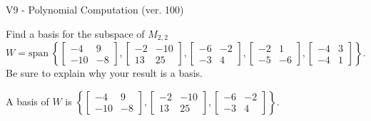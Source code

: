 \begin{exercise}
  \begin{exerciseTitle}V9 - Polynomial Computation (ver. 100)\end{exerciseTitle}
  \begin{exerciseStatement}
    Find a basis for the subspace of \(M_{2,2}\) 
\[W=\mathrm{span}\ \left\{\left[\begin{array}{cc}
-4 & 9 \\
-10 & -8
\end{array}\right] , \left[\begin{array}{cc}
-2 & -10 \\
13 & 25
\end{array}\right] , \left[\begin{array}{cc}
-6 & -2 \\
-3 & 4
\end{array}\right] , \left[\begin{array}{cc}
-2 & 1 \\
-5 & -6
\end{array}\right] , \left[\begin{array}{cc}
-4 & 3 \\
-4 & 1
\end{array}\right]\right\}.\]
 Be sure to explain why your result is a basis.


  \end{exerciseStatement}
  \begin{exerciseAnswer}
   A basis of \(W\) is  \(\left\{\left[\begin{array}{cc}
-4 & 9 \\
-10 & -8
\end{array}\right] , \left[\begin{array}{cc}
-2 & -10 \\
13 & 25
\end{array}\right] , \left[\begin{array}{cc}
-6 & -2 \\
-3 & 4
\end{array}\right]\right\}\).
  


  \end{exerciseAnswer}
\end{exercise}